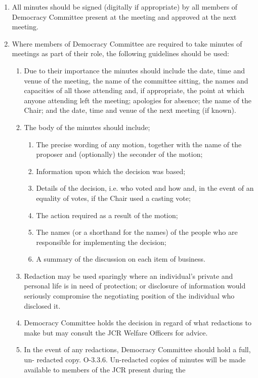 \begin{enumerate}
\begin{enumerate}
        \item All minutes should be signed (digitally if appropriate) by all members of Democracy Committee present at the meeting and approved at the next meeting.
        \item Where members of Democracy Committee are required to take minutes of meetings as part of their role, the following guidelines should be used:
        \begin{enumerate}
            \item Due to their importance the minutes should include the date, time and venue of the meeting, the name of the committee sitting, the names and capacities of all those attending and, if appropriate, the point at which anyone attending left the meeting; apologies for absence; the name of the Chair; and the date, time and venue of the next meeting (if known).
            \item The body of the minutes should include;
            \begin{enumerate}
                \item  The precise wording of any motion, together with the name of the proposer
                and (optionally) the seconder of the motion;
                \item Information upon which the decision was based;
                \item Details of the decision, i.e. who voted and how and, in the event of an equality of votes, if the Chair used a casting vote;
                \item The action required as a result of the motion;
                \item The names (or a shorthand for the names) of the people who are responsible
                for implementing the decision;
                \item A summary of the discussion on each item of business.
            \end{enumerate}
            \item Redaction may be used sparingly where an individual’s private and personal life is in need of protection; or disclosure of information would seriously compromise the negotiating position of the individual who disclosed it.
            \item Democracy Committee holds the decision in regard of what redactions to make but may consult the JCR Welfare Officers for advice.
            \item In the event of any redactions, Democracy Committee should hold a full, un- redacted copy. O-3.3.6. Un-redacted copies of minutes will be made available to members of the JCR present during the

\end{enumerate}
\end{enumerate}
\end{enumerate}
